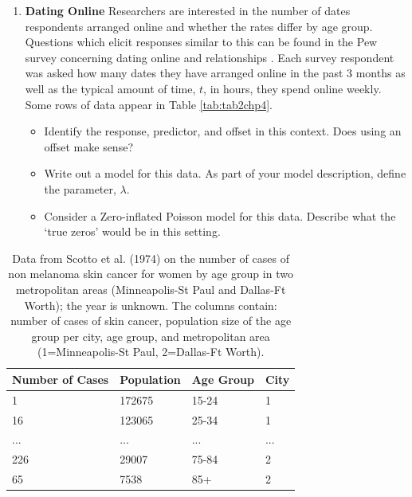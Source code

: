 \documentclass[
]{krantz}
\providecommand{\tightlist}{%
  \setlength{\itemsep}{0pt}\setlength{\parskip}{0pt}}
\begin{document}
\begin{enumerate}
\def\labelenumi{\arabic{enumi}.}
\setcounter{enumi}{14}
\item
  \textbf{Dating Online} Researchers are interested in the number of dates respondents arranged online and whether the rates differ by age group. Questions which elicit responses similar to this can be found in the Pew survey concerning dating online and relationships \citep{Duggan2013}. Each survey respondent was asked how many dates they have arranged online in the past 3 months as well as the typical amount of time, \(t\), in hours, they spend online weekly. Some rows of data appear in Table \ref{tab:tab2chp4}.

  \begin{itemize}
  \tightlist
  \item
    Identify the response, predictor, and offset in this context. Does using an offset make sense?
  \item
    Write out a model for this data. As part of your model description, define the parameter, \(\lambda\).
  \item
    Consider a Zero-inflated Poisson model for this data. Describe what the `true zeros' would be in this setting.
  \end{itemize}
\end{enumerate}

\begin{table}

\caption{\label{tab:tab3chp4}Data from Scotto et al. (1974) on the number of cases of non melanoma skin cancer for women by age group in two metropolitan areas (Minneapolis-St Paul and Dallas-Ft Worth); the year is unknown. The columns contain: number of cases of skin cancer, population size of the age group per city, age group, and metropolitan area (1=Minneapolis-St Paul, 2=Dallas-Ft Worth).}
\centering
\begin{tabular}[t]{l|l|l|l}
\hline
Number of Cases & Population & Age Group & City\\
\hline
1 & 172675 & 15-24 & 1\\
\hline
16 & 123065 & 25-34 & 1\\
\hline
... & ... & ... & ...\\
\hline
226 & 29007 & 75-84 & 2\\
\hline
65 & 7538 & 85+ & 2\\
\hline
\end{tabular}
\end{table}
\end{document}
